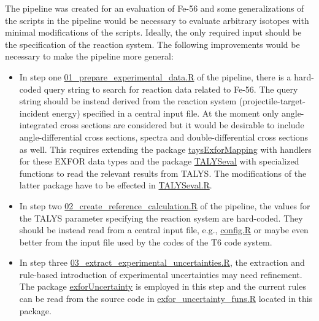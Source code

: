 \documentclass[12pt,a4paper]{scrartcl}
\begin{document}
The pipeline was created for an evaluation of Fe-56 and some generalizations of the scripts in the pipeline would be necessary to evaluate arbitrary isotopes with minimal modifications of the scripts.
Ideally, the only required input should be the specification of the reaction system.
The following improvements would be necessary to make the pipeline more general:
\begin{itemize}
\item In step one \href{https://github.com/gschnabel/eval-fe56/blob/master/script/01_prepare_experimental_data.R}{01\_prepare\_experimental\_data.R} of the pipeline, there is a hard-coded query string to search for reaction data related to Fe-56.
The query string should be instead derived from the reaction system (projectile-target-incident energy) specified in a central input file.
At the moment only angle-integrated cross sections are considered but it would be desirable to include angle-differential cross sections, spectra and double-differential cross sections as well.
This requires extending the package \mbox{\href{https://github.com/gschnabel/talysExforMapping}{taysExforMapping}} with handlers for these EXFOR data types and the package \href{https://github.com/gschnabel/TALYSeval}{TALYSeval} with specialized functions to read the relevant results from TALYS.
The modifications of the latter package have to be effected in \mbox{\href{https://github.com/gschnabel/TALYSeval/blob/master/R/TALYSeval.R}{TALYSeval.R}}. 


\item In step two \href{https://github.com/gschnabel/eval-fe56/blob/master/script/02_create_reference_calculation.R}{02\_create\_reference\_calculation.R} of the pipeline, the values for the TALYS parameter specifying the reaction system are hard-coded.
They should be instead read from a central input file, e.g., \href{https://github.com/gschnabel/eval-fe56/blob/master/config.R}{config.R} or maybe even better from the input file used by the codes of the T6 code system.

\item In step three \href{https://github.com/gschnabel/eval-fe56/blob/master/script/03_extract_experimental_uncertainties.R}{03\_extract\_experimental\_uncertainties.R}, the extraction and rule-based introduction of experimental uncertainties may need refinement.
The package \href{https://github.com/gschnabel/exforUncertainty}{exforUncertainty} is employed in this step and the current rules can be read from the source code in \href{https://github.com/gschnabel/exforUncertainty/blob/master/R/exfor_uncertainty_funs.R}{exfor\_uncertainty\_funs.R} located in this package.


\end{itemize}
\end{document}
